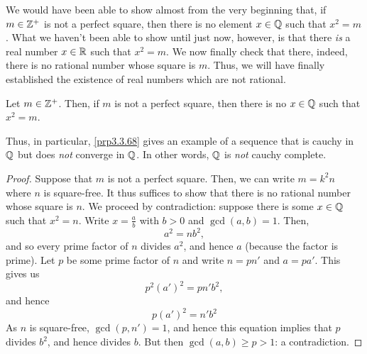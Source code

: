 We would have been able to show almost from the very beginning that, if $m\in \mathbb{Z} ^+$ is not a perfect square, then there is no element $x\in \mathbb{Q}$ such that $x^2=m$.  What we haven't been able to show until just now, however, is that there \emph{is} a real number $x\in \mathbb{R}$ such that $x^2=m$.  We now finally check that there, indeed, there is no rational number whose square is $m$.  Thus, we will have finally established the existence of real numbers which are not rational.
\begin{prp}\label{prp3.3.68}
Let $m\in \mathbb{Z} ^+$.  Then, if $m$ is not a perfect square, then there is no $x\in \mathbb{Q}$ such that $x^2=m$.
\begin{rmk}
Thus, in particular, \cref{prp3.3.68} gives an example of a sequence that is cauchy in $\mathbb{Q}$ but does \emph{not} converge in $\mathbb{Q}$.  In other words, $\mathbb{Q}$ is \emph{not} cauchy complete.
\end{rmk}
\begin{proof}
Suppose that $m$ is not a perfect square.  Then, we can write $m=k^2n$ where $n$ is square-free.  It thus suffices to show that there is no rational number whose square is $n$.  We proceed by contradiction:  suppose there is some $x\in \mathbb{Q}$ such that $x^2=n$.  Write $x=\frac{a}{b}$ with $b>0$ and $\gcd (a,b)=1$.  Then,
\begin{equation}
a^2=nb^2,
\end{equation}
and so every prime factor of $n$ divides $a^2$, and hence $a$ (because the factor is prime).  Let $p$ be some prime factor of $n$ and write $n=pn'$ and $a=pa'$.  This gives us
\begin{equation}
p^2(a')^2=pn'b^2,
\end{equation}
and hence
\begin{equation}
p(a')^2=n'b^2
\end{equation}
As $n$ is square-free, $\gcd (p,n')=1$, and hence this equation implies that $p$ divides $b^2$, and hence divides $b$.  But then $\gcd (a,b)\geq p>1$:  a contradiction.
\end{proof}
\end{prp}

